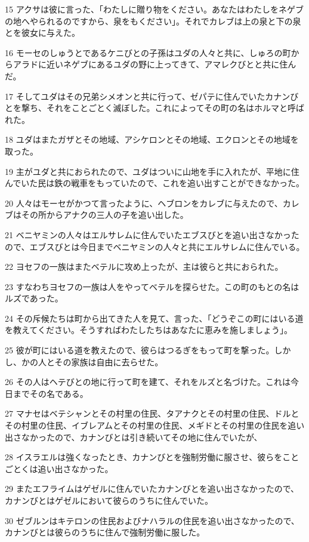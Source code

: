 \par 15 アクサは彼に言った、「わたしに贈り物をください。あなたはわたしをネゲブの地へやられるのですから、泉をもください」。それでカレブは上の泉と下の泉とを彼女に与えた。
\par 16 モーセのしゅうとであるケニびとの子孫はユダの人々と共に、しゅろの町からアラドに近いネゲブにあるユダの野に上ってきて、アマレクびとと共に住んだ。
\par 17 そしてユダはその兄弟シメオンと共に行って、ゼパテに住んでいたカナンびとを撃ち、それをことごとく滅ぼした。これによってその町の名はホルマと呼ばれた。
\par 18 ユダはまたガザとその地域、アシケロンとその地域、エクロンとその地域を取った。
\par 19 主がユダと共におられたので、ユダはついに山地を手に入れたが、平地に住んでいた民は鉄の戦車をもっていたので、これを追い出すことができなかった。
\par 20 人々はモーセがかつて言ったように、ヘブロンをカレブに与えたので、カレブはその所からアナクの三人の子を追い出した。
\par 21 ベニヤミンの人々はエルサレムに住んでいたエブスびとを追い出さなかったので、エブスびとは今日までベニヤミンの人々と共にエルサレムに住んでいる。
\par 22 ヨセフの一族はまたベテルに攻め上ったが、主は彼らと共におられた。
\par 23 すなわちヨセフの一族は人をやってベテルを探らせた。この町のもとの名はルズであった。
\par 24 その斥候たちは町から出てきた人を見て、言った、「どうぞこの町にはいる道を教えてください。そうすればわたしたちはあなたに恵みを施しましょう」。
\par 25 彼が町にはいる道を教えたので、彼らはつるぎをもって町を撃った。しかし、かの人とその家族は自由に去らせた。
\par 26 その人はヘテびとの地に行って町を建て、それをルズと名づけた。これは今日までその名である。
\par 27 マナセはベテシャンとその村里の住民、タアナクとその村里の住民、ドルとその村里の住民、イブレアムとその村里の住民、メギドとその村里の住民を追い出さなかったので、カナンびとは引き続いてその地に住んでいたが、
\par 28 イスラエルは強くなったとき、カナンびとを強制労働に服させ、彼らをことごとくは追い出さなかった。
\par 29 またエフライムはゲゼルに住んでいたカナンびとを追い出さなかったので、カナンびとはゲゼルにおいて彼らのうちに住んでいた。
\par 30 ゼブルンはキテロンの住民およびナハラルの住民を追い出さなかったので、カナンびとは彼らのうちに住んで強制労働に服した。
